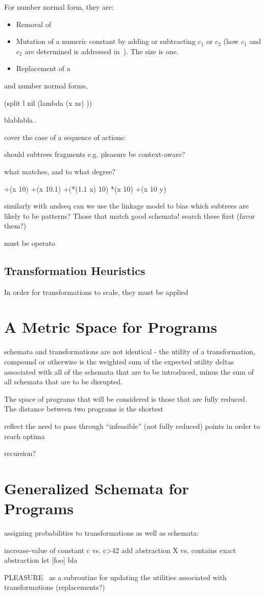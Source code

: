 \documentclass[letterpaper]{article}
\begin{document}
For number normal form, they are:
\begin{itemize}
\item Removal of 
\item Mutation of a numeric constant by adding or subtracting $c_1$ or $c_2$
  (how $c_1$ and $c_2$ are determined is addressed in~\cite{MosesWiki}). The
  size is one.
\item Replacement of a 

\end{itemize}

and number normal forms, 

(split l nil (lambda (x xs) ))


blablabla..

cover the case of a sequence of actions:

should subtrees fragments e.g. pleasure be context-aware?

what matches, and to what degree?

+(x 10)
+(x 10.1)
+(*(1.1 x) 10)
*(x 10)
+(x 10 y)

similarly with andseq
can we use the linkage model to bias which subtrees are likely to be patterns?
Those that match good schemata! search these first (favor them?)

must be operato

\subsection{Transformation Heuristics}

In order for transformations to scale, they must be applied 

\section{A Metric Space for Programs}

schemata and transformations are not identical - the utility of a
transformation, compound or otherwise is the weighted sum of the expected
utility deltas associated with all of the schemata that are to be introduced,
minus the sum of all schemata that are to be disrupted.


The space of programs that will be considered is those that are fully
reduced. The distance between two programs is the shortest 

reflect the need to pass through ``infeasible'' (not fully reduced) points in
order to reach optima

recursion?

\section{Generalized Schemata for Programs}

assigning probabilities to transformations as well as schemata:

increase-value of constant c vs. c>42
add abstraction X vs. contains exact abstraction let [foo] bla

PLEASURE~\cite{PLEASURE} as a subroutine for updating the utilities associated
with transformations (replacements?)



\end{document}
